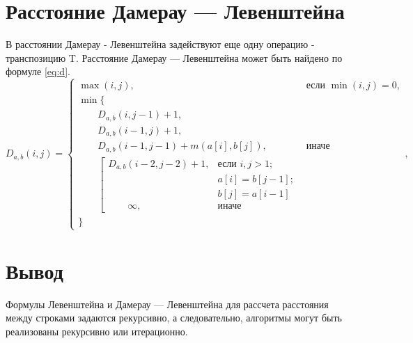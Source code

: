 \section{Расстояние Дамерау — Левенштейна}
В расстоянии Дамерау - Левенштейна задействуют еще одну операцию - транспозицию T.
Расстояние Дамерау — Левенштейна может быть найдено по формуле \ref{eq:d}.
\begin{equation}
	\label{eq:d}
	D_{a,b}(i, j) = \begin{cases}
		\max(i, j), &\text{если }\min(i, j) = 0,\\
		\min \lbrace \\
			\qquad D_{a,b}(i, j-1) + 1,\\
			\qquad D_{a,b}(i-1, j) + 1,\\
			\qquad D_{a,b}(i-1, j-1) + m(a[i], b[j]), &\text{иначе}\\
			\qquad \left[ \begin{array}{cc}D_{a,b}(i-2, j-2) + 1, &\text{если }i,j > 1;\\
			\qquad &\text{}a[i] = b[j-1]; \\
			\qquad &\text{}b[j] = a[i-1]\\
			\qquad \infty, & \text{иначе}\end{array}\right.\\
		\rbrace
		\end{cases},
\end{equation}


\section*{Вывод}

Формулы Левенштейна и Дамерау — Левенштейна для рассчета расстояния между строками задаются рекурсивно, а следовательно, алгоритмы могут быть реализованы рекурсивно или итерационно.
